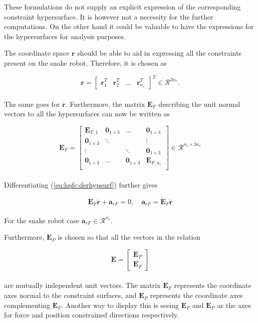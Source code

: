 These formulations do not supply an explicit expression of the corresponding constraint hypersurface. It is however not a necessity for the further computations. On the other hand it could be valuable to have the expressions for the hypersurfaces for analysis purposes.

The coordinate space $\mathbf{r}$ should be able to aid in expressing all the constraints present on the snake robot. Therefore, it is chosen as 

\begin{equation}
    \mathbf{r} = 
    \begin{bmatrix}
        \mathbf{r}_1^T & \mathbf{r}_2^T & \dots &\mathbf{r}_{n_c}^T
    \end{bmatrix}^T \in \mathcal{R}^{3 n_c}.
\end{equation}
\\
The same goes for $\dot{\mathbf{r}}$. Furthermore, the matrix $\mathbf{E}_{F}$ describing the unit normal vectors to all the hypersurfaces can now be written as

\begin{equation}
    \mathbf{E}_F = 
    \begin{bmatrix}
        \mathbf{E}_{F,1} & \mathbf{0}_{1\times3} & \dots & \mathbf{0}_{1\times3} \\
        \mathbf{0}_{1\times3} & \ddots & & \vdots \\
        \vdots & & \ddots & \mathbf{0}_{1\times3} \\
        \mathbf{0}_{1\times3} & \dots & \mathbf{0}_{1\times3} & \mathbf{E}_{F,n_c} \\
    \end{bmatrix} \in \mathcal{R}^{n_c \times 3 n_c}
\end{equation}
\\

Differentiating (\ref{eq:hpfc:derhypsurf}) further gives

\begin{equation}\label{eq:dhpfc_arf}
    \mathbf{E}_F \mathbf{\ddot{r}} + \mathbf{a}_{r F} = 0, \quad \mathbf{a}_{r F} = \mathbf{\dot{E}}_F\mathbf{\dot{r}}
\end{equation}
\\
For the snake robot case $\mathbf{a}_{r F} \in \mathcal{R}^{n_c}$.

Furthermore, $\mathbf{E}_P$ is chosen so that all the vectors in the relation

\begin{equation}\label{eq:dhpfc_E}
    \mathbf{E} =
    \begin{bmatrix}
    \mathbf{E}_P \\ \mathbf{E}_F
    \end{bmatrix}
\end{equation}
\\
are mutually independent unit vectors. The matrix $\mathbf{E}_F$ represents the coordinate axes normal to the constraint surfaces, and $\mathbf{E}_P$ represents the coordinate axes complementing $\mathbf{E}_F$. Another way to display this is seeing $\mathbf{E}_F$ and $\mathbf{E}_P$ as the axes for force and position constrained directions respectively.

